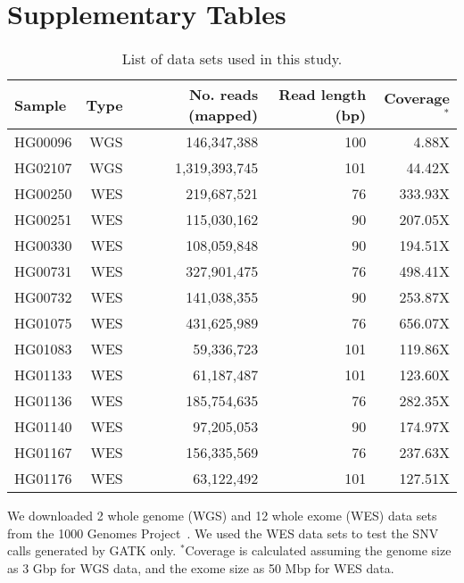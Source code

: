


\section*{Supplementary Tables}
\setcounter{table}{0}
\setcounter{page}{1}

\renewcommand{\tablename}{Supplementary Table}
\renewcommand{\thetable}{S\arabic{table}}%

\onecolumn

\begin{table*}[htb]
\caption{List of data sets used in this study.}
\begin{center}
\begin{tabular}{|l|r|r|r|r|}
\hline
{\bf Sample} & {\bf Type} & {\bf No. reads (mapped)} & {\bf Read length (bp)} & {\bf Coverage$^*$}\\
\hline
HG00096 & WGS & 146,347,388 & 100 & 4.88X\\
HG02107 & WGS & 1,319,393,745 & 101 & 44.42X\\
\hline
HG00250 & WES & 219,687,521 & 76 & 333.93X \\ 
HG00251 & WES & 115,030,162 & 90 & 207.05X \\ 
HG00330 & WES & 108,059,848 & 90 & 194.51X \\ 
HG00731 & WES & 327,901,475 & 76 & 498.41X \\ 
HG00732 & WES & 141,038,355 & 90 & 253.87X \\ 
HG01075 & WES & 431,625,989 & 76 & 656.07X \\ 
HG01083 & WES & 59,336,723 & 101 & 119.86X \\ 
HG01133 & WES & 61,187,487 & 101 & 123.60X \\ 
HG01136 & WES & 185,754,635 & 76 & 282.35X \\ 
HG01140 & WES & 97,205,053 & 90 & 174.97X \\ 
HG01167 & WES & 156,335,569 & 76 & 237.63X \\ 
HG01176 & WES & 63,122,492 & 101 & 127.51X \\ 
\hline
\end{tabular}
\end{center}
{\footnotesize We downloaded 2 whole genome (WGS) and 12 whole exome (WES) data sets from the 1000 Genomes Project~\citep{1000GP2015}. We
  used the WES data sets to test the SNV calls generated by GATK only.
  $^*$Coverage is calculated assuming the genome size as 3 Gbp for WGS data, and the exome size as 50 Mbp for WES data.}
\label{supptab:data}
\end{table*}

